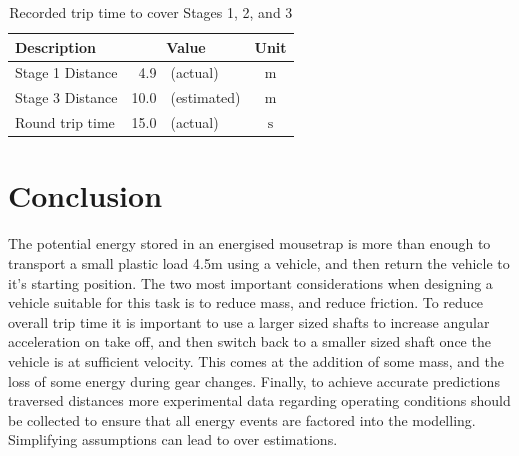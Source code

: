 \documentclass[a4paper]{article}
\begin{document}
\vspace{1cm}

\begin{table}[h]
	\centering
	\caption{Recorded trip time to cover Stages 1, 2, and 3}
	\begin{tabular}{lrlc}
		\toprule
		Description & \multicolumn{2}{c}{Value} & Unit  \\
		\midrule
		Stage 1 Distance & ~4.9 & (actual) & $\si{\meter}$ \\
		Stage 3 Distance & 10.0 & (estimated) & $\si{\meter}$ \\
		Round trip time & 15.0 & (actual) & $\si{\second}$ \\
		\bottomrule
	\end{tabular}
\end{table}

\newpage

\section{Conclusion}
The potential energy stored in an energised mousetrap is more than enough to transport a small plastic load 4.5$\si{\meter}$ using a vehicle, and then return the vehicle to it's starting position. The two most important considerations when designing a vehicle suitable for this task is to reduce mass, and reduce friction. To reduce overall trip time it is important to use a larger sized shafts to increase angular acceleration on take off, and then switch back to a smaller sized shaft once the vehicle is at sufficient velocity. This comes at the addition of some mass, and the loss of some energy during gear changes. Finally, to achieve accurate predictions traversed distances more experimental data regarding operating conditions should be collected to ensure that all energy events are factored into the modelling. Simplifying assumptions can lead to over estimations. 



\end{document}
